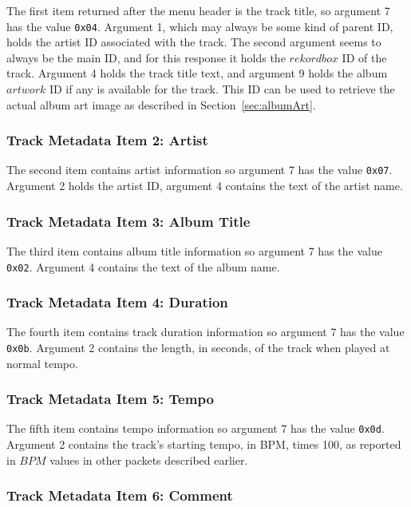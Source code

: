 \documentclass[11pt]{article}
\begin{document}
The first item returned after the menu header is the track title, so
argument 7 has the value {\tt 0x04}. Argument 1, which may always be
some kind of parent ID, holds the artist ID associated with the track.
The second argument seems to always be the main ID, and for this
response it holds the $rekordbox$ ID of the track. Argument 4 holds
the track title text, and argument 9 holds the album $artwork$ ID if
any is available for the track. This ID can be used to retrieve the
actual album art image as described in Section~\ref{sec:albumArt}.

\subsubsection{Track Metadata Item 2: Artist}

The second item contains artist information so argument 7 has the
value {\tt 0x07}. Argument 2 holds the artist ID, argument 4 contains
the text of the artist name.

\subsubsection{Track Metadata Item 3: Album Title}

The third item contains album title information so argument 7 has the
value {\tt 0x02}. Argument 4 contains the text of the album name.

\subsubsection{Track Metadata Item 4: Duration}

The fourth item contains track duration information so argument 7 has
the value {\tt 0x0b}. Argument 2 contains the length, in seconds, of
the track when played at normal tempo.

\subsubsection{Track Metadata Item 5: Tempo}

The fifth item contains tempo information so argument 7 has the value
{\tt 0x0d}. Argument 2 contains the track's starting tempo, in BPM,
times 100, as reported in $BPM$ values in other packets described
earlier.

\subsubsection{Track Metadata Item 6: Comment}
\end{document}

